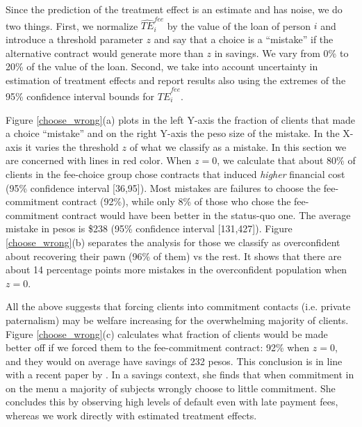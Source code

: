 \documentclass[11pt]{article}
\begin{document}
Since the prediction of the treatment effect is an estimate and has noise, we do two things. First, we normalize $\widehat{TE}^{fee}_{i}$ by the value of the loan of person $i$ and introduce a threshold parameter $z$ and say that a choice is a ``mistake'' if the alternative contract would generate more than $z$ in savings. We vary from 0\% to 20\% of the value of the loan. Second, we take into account uncertainty in estimation of treatment effects and report results also using the extremes of the 95\% confidence interval bounds for $\widehat{TE}^{fee}_{i}$. 

Figure \ref{choose_wrong}(a) plots in the left Y-axis the fraction of clients that made a choice ``mistake'' and on the right Y-axis the peso size of the mistake. In the X-axis it varies the threshold $z$ of what we classify as a mistake. In this section we are concerned with lines in red color. When $z=0$, we calculate that about 80\% of clients in the fee-choice group chose contracts that induced \textit{higher} financial cost (95\% confidence interval [36,95]). Most mistakes are failures to choose the fee-commitment contract (92\%), while only 8\% of those who chose the fee-commitment contract would have been better in the status-quo one. The average mistake in pesos is \$238 (95\% confidence interval [131,427]). Figure \ref{choose_wrong}(b) separates the analysis for those we classify as overconfident about recovering their pawn (96\% of them) vs the rest. It shows that there are about 14 percentage points more mistakes in the overconfident population when $z=0$.

All the above suggests that forcing clients into commitment contacts (i.e. private paternalism) may be welfare increasing for the overwhelming majority of clients. Figure \ref{choose_wrong}(c) calculates what fraction of clients would be made better off if we forced them to the fee-commitment contract: 92\% when $z=0$, and they would on average have savings of 232 pesos. This conclusion is in line with a recent paper by \cite{John}. In a savings context, she finds that when commitment in on the menu a majority of subjects wrongly choose to little commitment. She concludes this by observing high levels of default even with late payment fees, whereas we work directly with estimated treatment effects.
\end{document}
